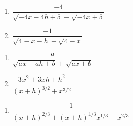 \documentclass{ximera}
\begin{document}
\begin{multicols}{2}
\begin{enumerate}
\setcounter{enumi}{\value{HW}}

\item $\dfrac{-4}{\sqrt{-4x-4h+5} + \sqrt{-4x+5}}$
\item $\dfrac{-1}{\sqrt{4-x-h} + \sqrt{4-x}}$

\setcounter{HW}{\value{enumi}}
\end{enumerate}
\end{multicols}

\begin{multicols}{2}
\begin{enumerate}
\setcounter{enumi}{\value{HW}}

\item $\dfrac{a}{\sqrt{ax+ah+b} + \sqrt{ax+b}}$
\item  $\dfrac{3x^2+3xh+h^2}{(x+h)^{3/2} + x^{3/2}} $

\setcounter{HW}{\value{enumi}}
\end{enumerate}
\end{multicols}

\begin{enumerate}
\setcounter{enumi}{\value{HW}}

\item  $\dfrac{1}{(x+h)^{2/3} + (x+h)^{1/3} x^{1/3} + x^{2/3}}$

\setcounter{HW}{\value{enumi}}
\end{enumerate}
\end{document}
